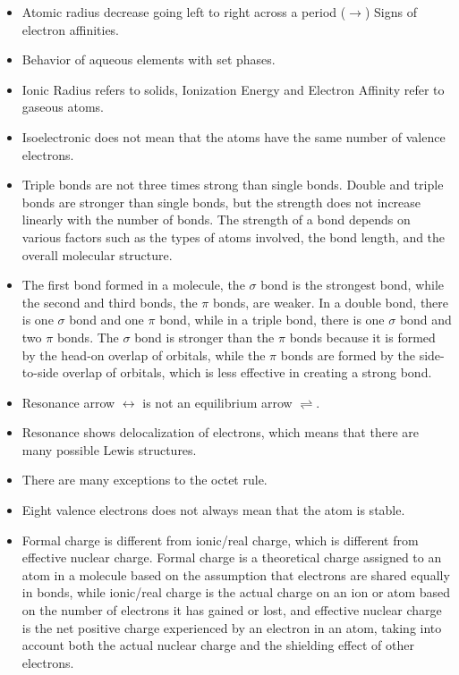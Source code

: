 \begin{itemize}
            \item Atomic radius decrease going left to right across a period ($\rightarrow$)
            Signs of electron affinities.
            \item Behavior of aqueous elements with set phases.
            \item Ionic Radius refers to solids, Ionization Energy and Electron Affinity refer to gaseous atoms.
            \item Isoelectronic does not mean that the atoms have the same number of valence electrons.
            \item Triple bonds are not three times strong than single bonds. Double and triple bonds are stronger than single bonds, but the strength does not increase linearly with the number of bonds. The strength of a bond depends on various factors such as the types of atoms involved, the bond length, and the overall molecular structure.
            \item The first bond formed in a molecule, the $\sigma$ bond is the strongest bond, while the second and third bonds, the $\pi$ bonds, are weaker. In a double bond, there is one $\sigma$ bond and one $\pi$ bond, while in a triple bond, there is one $\sigma$ bond and two $\pi$ bonds. The $\sigma$ bond is stronger than the $\pi$ bonds because it is formed by the head-on overlap of orbitals, while the $\pi$ bonds are formed by the side-to-side overlap of orbitals, which is less effective in creating a strong bond.
            \item Resonance arrow $\leftrightarrow$ is not an equilibrium arrow $\rightleftharpoons$.
            \item Resonance shows delocalization of electrons, which means that there are many possible Lewis structures.
            \item There are many exceptions to the octet rule.
            \item Eight valence electrons does not always mean that the atom is stable. 
            \item Formal charge is different from ionic/real charge, which is different from effective nuclear charge. Formal charge is a theoretical charge assigned to an atom in a molecule based on the assumption that electrons are shared equally in bonds, while ionic/real charge is the actual charge on an ion or atom based on the number of electrons it has gained or lost, and effective nuclear charge is the net positive charge experienced by an electron in an atom, taking into account both the actual nuclear charge and the shielding effect of other electrons.

\end{itemize}
